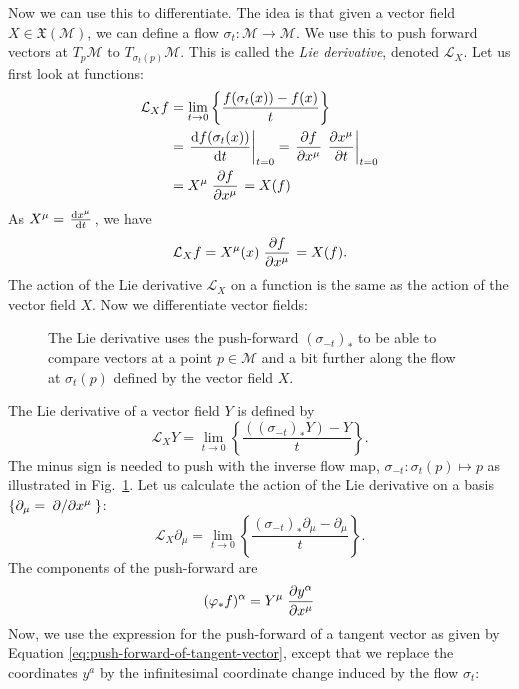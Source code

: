 Now we can use this to differentiate. The idea is that given a vector field $X \in \mathfrak{X}(\mathcal{M})$, we can define a flow $\sigma_t\colon \mathcal{M} \to \mathcal{M}$. We use this to push forward vectors at $T_p \mathcal{M}$ to $T_{\sigma_t (p)} \mathcal{M}$.
This is called the \emph{Lie derivative}, denoted $\mathcal{L}_X$.
Let us first look at functions:
\begin{align}
  \mathcal{L}_X f &= \lim_{t \to 0} \left\{ \frac{f(\sigma_t(x)) - f(x)}{t} \right\} \\
		  &= \left.\dv{f(\sigma_t(x))}{t}\right\rvert_{t=0} = \left.\pdv{f}{x^\mu}\right. \left.\pdv{x^\mu}{t}\right\rvert_{t=0} \\
		  &= X^\mu \left.\pdv{f}{x^\mu}\right. = X(f)
\end{align}
As $X^\mu = \left.\dv{x^\mu}{t}\right.$, we have
\begin{equation}
  \mathcal{L}_X f = X^\mu(x) \left.\pdv{f}{x^\mu}\right. = X(f).
\end{equation}
The action of the Lie derivative $\mathcal{L}_X$ on a function is the same as the action of the vector field $X$.
Now we differentiate vector fields:
\begin{figure}[htpb]
  \centering
  \def\svgwidth{0.85\columnwidth}
  
  \caption{The Lie derivative uses the push-forward $(\sigma_{-t})_*$ to be able to compare vectors at a point $p \in \mathcal{M}$ and a bit further along the flow at $\sigma_t(p)$ defined by the vector field $X$.}
  \label{fig:liediffvf}
\end{figure}
The Lie derivative of a vector field $Y$ is defined by
\begin{equation}
  \mathcal{L}_X Y = \lim_{t\to 0} \left\{ \frac{((\sigma_{-t})_*Y) - Y}{t} \right\}.
\end{equation}
The minus sign is needed to push with the inverse flow map, $\sigma_{-t}\colon \sigma_t(p) \mapsto p$ as illustrated in Fig.~\ref{fig:liediffvf}.
Let us calculate the action of the Lie derivative on a basis $\{ \partial_\mu = \left.\pdv*{}{x^\mu}\right. \}$:
\begin{equation}
  \mathcal{L}_X \partial_\mu = \lim_{t \to 0} \left\{ \frac{(\sigma_{-t})_* \partial_\mu - \partial_\mu}{t} \right\}.
\end{equation}
The components of the push-forward are
\begin{equation}
  (\varphi_* f)^\alpha = Y^\mu \left.\pdv{y^\alpha}{x^\mu}\right.
\end{equation}
Now, we use the expression for the push-forward of a tangent vector as given by Equation \eqref{eq:push-forward-of-tangent-vector}, except that we replace the coordinates $y^a$ by the infinitesimal coordinate change induced by the flow $\sigma_t$:
